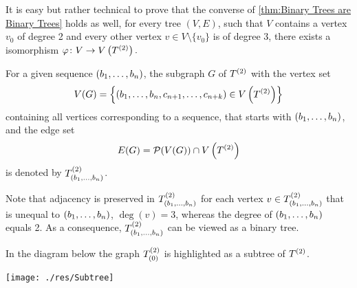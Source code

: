 \begin{rem}
It is easy but rather technical to prove that the converse of \cref{thm:Binary Trees are Binary Trees} holds as well, \ie for every tree $(V,E)$, such that $V$ contains a vertex $v_0$ of degree 2 and every other vertex $v\in V\setminus\lbrace v_0\rbrace$ is of degree 3, there exists a isomorphism $\varphi\colon V\to\VT.$ 
\end{rem}

\begin{defin}
For a given sequence $(\seq{b})$, the subgraph $G$ of $\T$ with the vertex set 
\begin{equation*}
V(G)=\left\lbrace (\seq[n]{b},c_{n+1},\ldots,c_{n+k})\in\VT \right\rbrace
\end{equation*}
containing all vertices corresponding to a sequence, that starts with $(\seq{b})$, and the edge set
\begin{equation*}
E(G)=\mathcal{P}(V(G))\cap \VT
\end{equation*}
is denoted by $\ST{(\seq{b})}$.
\end{defin}

Note that adjacency is preserved in $\ST{(\seq{b})}$ for each vertex $v\in\ST{(\seq{b})}$ that is unequal to $(\seq{b})$, \ie $\deg(v)=3$, whereas the degree of $(\seq{b})$ equals 2. As a consequence, $\ST{(\seq{b})}$ can be viewed as a binary tree.

In the diagram below the graph $\ST{(0)}$ is highlighted as a subtree of $\T$.

\begin{center}
\texttt{[image: ./res/Subtree]}
%
%
\end{center}

